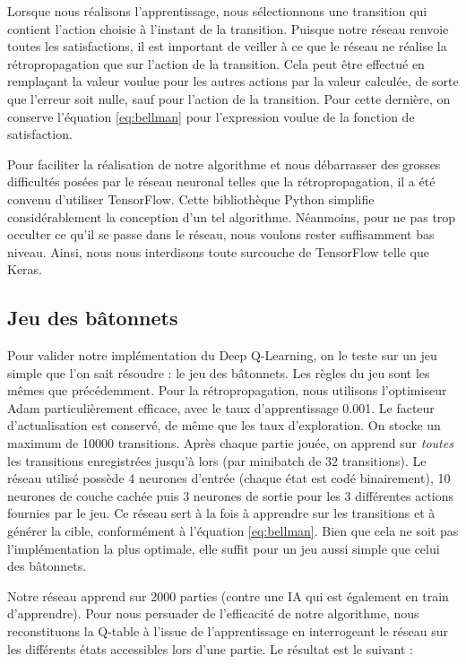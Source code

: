 Lorsque nous réalisons l'apprentissage, nous sélectionnons une transition qui contient l'action choisie à l'instant de la transition. Puisque notre réseau renvoie
toutes les satisfactions, il est important de veiller à ce que le réseau ne réalise la rétropropagation que sur l'action de la transition. Cela peut être 
effectué en remplaçant la valeur voulue pour les autres actions par la valeur calculée, de sorte que l'erreur soit nulle, sauf pour l'action de la transition.
Pour cette dernière, on conserve l'équation \ref{eq:bellman} pour l'expression voulue de la fonction de satisfaction.

Pour faciliter la réalisation de notre algorithme et nous débarrasser des grosses difficultés posées par le réseau neuronal telles que la rétropropagation, il 
a été convenu d'utiliser TensorFlow. Cette bibliothèque Python simplifie considérablement la conception d'un tel algorithme. Néanmoins, pour ne pas trop occulter 
ce qu'il se passe dans le réseau, nous voulons rester suffisamment bas niveau. Ainsi, nous nous interdisons toute surcouche de TensorFlow telle que Keras.


\subsection{Jeu des bâtonnets}

Pour valider notre implémentation du Deep Q-Learning, on le teste sur un jeu simple que l'on sait résoudre : le jeu des bâtonnets. Les règles du jeu sont les mêmes 
que précédemment. Pour la rétropropagation, nous utilisons l'optimiseur Adam particulièrement efficace, avec le taux d'apprentissage 0.001. Le facteur d'actualisation
est conservé, de même que les taux d'exploration. On stocke un maximum de 10000 transitions. Après chaque partie jouée, on apprend sur \emph{toutes} les transitions
enregistrées jusqu'à lors (par minibatch de 32 transitions). Le réseau utilisé possède 4 neurones d'entrée (chaque état est codé binairement), 10 neurones de couche cachée
puis 3 neurones de sortie pour les 3 différentes actions fournies par le jeu. Ce réseau sert à la fois à apprendre sur les transitions et à générer la cible, 
conformément à l'équation \ref{eq:bellman}. Bien que cela ne soit pas l'implémentation la plus optimale, elle suffit pour un jeu aussi simple que celui des bâtonnets.

Notre réseau apprend sur 2000 parties (contre une IA qui est également en train d'apprendre). Pour nous persuader de l'efficacité de notre algorithme, nous reconstituons
la Q-table à l'issue de l'apprentissage en interrogeant le réseau sur les différents états accessibles lors d'une partie. Le résultat est le suivant :


